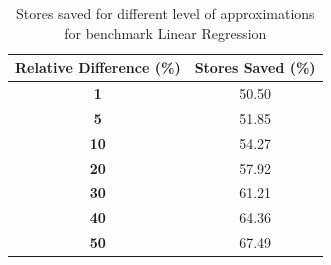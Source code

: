 \begin{table}[htbp]
\caption{Stores saved for different level of approximations for benchmark Linear Regression}
	\begin{center}
		\begin{tabular}{|c|c|}
			\hline

			\textbf{Relative Difference (\%)} & \textbf{Stores Saved (\%)}\\
			\hline

			\textbf{1} & 50.50\\
			\hline

			\textbf{5} & 51.85\\
			\hline

			\textbf{10} & 54.27\\
			\hline

			\textbf{20} & 57.92\\
			\hline

			\textbf{30} & 61.21\\
			\hline

			\textbf{40} & 64.36\\
			\hline

			\textbf{50} & 67.49\\
			\hline

		\end{tabular}
	\label{tab:linear_regression_reldiff}
	\end{center}
\end{table}




